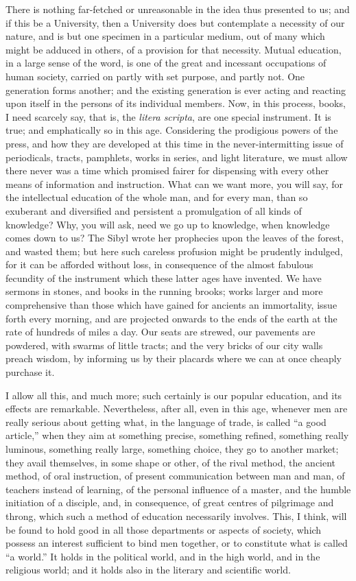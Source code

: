 There is nothing far-fetched or unreasonable in the idea thus
presented to us; and if this be a University, then a University does
but contemplate a necessity of our nature, and is but one specimen in
a particular medium, out of many which might be adduced in others, of
a provision for that necessity. Mutual education, in a large sense of
the word, is one of the great and incessant occupations of human
society, carried on partly with set purpose, and partly not. One
generation forms another; and the existing generation is ever
acting and reacting upon itself in the persons of its individual
members. Now, in this process, books, I need scarcely say, that is,
the \emph{litera scripta}, are one special instrument. It is true; and
emphatically so in this age. Considering the prodigious powers of the
press, and how they are developed at this time in the
never-intermitting issue of periodicals, tracts, pamphlets, works in
series, and light literature, we must allow there never was a time
which promised fairer for dispensing with every other means of
information and instruction. What can we want more, you will say, for
the intellectual education of the whole man, and for every man, than
so exuberant and diversified and persistent a promulgation of all
kinds of knowledge? Why, you will ask, need we go up to knowledge,
when knowledge comes down to us? The Sibyl wrote her prophecies upon
the leaves of the forest, and wasted them; but here such careless
profusion might be prudently indulged, for it can be afforded without
loss, in consequence of the almost fabulous fecundity of the
instrument which these latter ages have invented. We have sermons in
stones, and books in the running brooks; works larger and more
comprehensive than those which have gained for ancients an
immortality, issue forth every morning, and are projected onwards to
the ends of the earth at the rate of hundreds of miles a day. Our
seats are strewed, our pavements are powdered, with swarms of little
tracts; and the very bricks of our city walls preach wisdom, by
informing us by their placards where we can at once cheaply purchase
it.

I allow all this, and much more; such certainly is our popular
education, and its effects are remarkable. Nevertheless, after all,
even in this age, whenever men are really serious about getting what,
in the language of trade, is called ``a good article,''
when they aim at something precise, something refined, something
really luminous, something really large, something choice, they go to
another market; they avail themselves, in some shape or other, of the
rival method, the ancient method, of oral instruction, of present
communication between man and man, of teachers instead of learning, of
the personal influence of a master, and the humble initiation of a
disciple, and, in consequence, of great centres of pilgrimage and
throng, which such a method of education necessarily involves. This, I
think, will be found to hold good in all those departments or aspects
of society, which possess an interest sufficient to bind men together,
or to constitute what is called ``a world.'' It holds in the
political world, and in the high world, and in the religious world;
and it holds also in the literary and scientific world.

